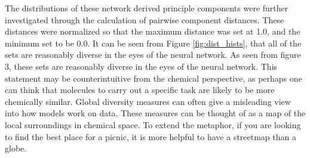 The distributions of these network derived principle components were further investigated through the calculation of pairwise component distances. These distances were normalized so that the maximum distance was set at 1.0, and the minimum set to be 0.0. It can be seen from Figure \ref{fig:dist_hists}, that all of the sets are reasonably diverse in the eyes of the neural network.  As seen from figure 3, these sets are reasonably diverse in the eyes of the neural network. This statement may be counterintuitive from the chemical perspective, as perhaps one can think that molecules to carry out a specific task are likely to be more chemically similar. Global diversity measures can often give a misleading view into how models work on data. These measures can be thought of as a map of the local surroundings in chemical space.  To extend the metaphor, if you are looking to find the best place for a picnic, it is more helpful to have a streetmap than a globe.